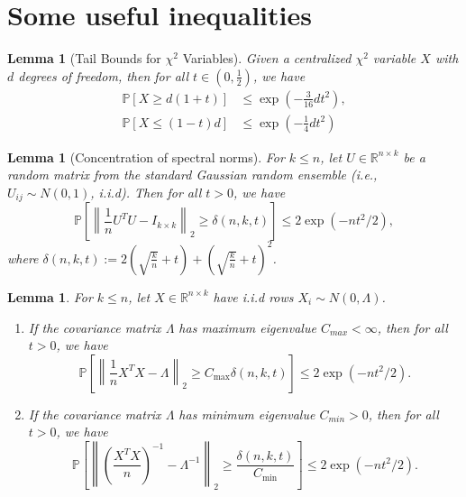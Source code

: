 \documentclass[12pt]{article}
\numberwithin{equation}{section}
\newtheorem{lemma}[theorem]{Lemma}
\begin{document}
\section{Some useful inequalities}
\begin{lemma}[Tail Bounds for $\chi^2$ Variables]
	Given a centralized $\chi^2$ variable $X$ with $d$ degrees of freedom, then for all $t \in (0,\frac{1}{2})$, we have
	\begin{align}
	\mathbb{P}[X \geq d(1+t)]& \leq \exp \left(-\frac{3}{16} d t^{2}\right),\\
	\mathbb{P}[X \leq(1-t) d]& \leq \exp \left(-\frac{1}{4} d t^{2}\right)
	\end{align}
\end{lemma}
\begin{lemma}[Concentration of spectral norms]
	For $k\leq n$, let $U \in \mathbb{R}^{n\times k}$ be a random matrix from the standard Gaussian random ensemble (i.e., $U_{i j} \sim N(0,1)$, i.i.d). Then for all $t>0$, we have
	\begin{equation}
	\mathbb{P}\left[\left\|\frac{1}{n} U^{T} U-I_{k \times k}\right\|_{2} \geq \delta(n, k, t)\right] \leq 2 \exp \left(-n t^{2} / 2\right),
	\end{equation}
	where $\delta(n, k, t):=2\left(\sqrt{\frac{k}{n}}+t\right)+\left(\sqrt{\frac{k}{n}}+t\right)^2$.
\end{lemma}
\begin{lemma}
	For $k\leq n$, let $X\in \mathbb{R}^{n\times k}$ have i.i.d rows $X_{i} \sim N(0, \Lambda)$.
	\begin{enumerate}
		\item If the covariance matrix $\Lambda$ has maximum eigenvalue $C_{max}<\infty$, then for all $t>0$, we have
		\begin{equation}
		\mathbb{P}\left[\left\|\frac{1}{n} X^{T} X-\Lambda\right\|_{2} \geq C_{\max } \delta(n, k, t)\right] \leq 2 \exp \left(-n t^{2} / 2\right).
		\end{equation}
		\item If the covariance matrix $\Lambda$ has minimum eigenvalue $C_{min}>0$, then for all $t>0$, we have
		\begin{equation}
		\mathbb{P}\left[\left\|\left(\frac{X^{T} X}{n}\right)^{-1}-\Lambda^{-1}\right\|_{2} \geq \frac{\delta(n, k, t)}{C_{\min }}\right] \leq 2 \exp \left(-n t^{2} / 2\right).
		\end{equation}
	\end{enumerate}
\end{lemma}

\end{document}
